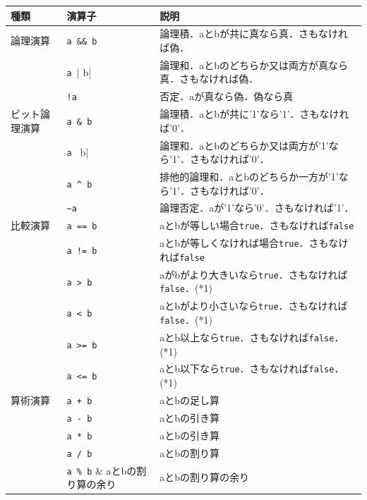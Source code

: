\documentclass[a4paper,dvipdfmx]{jsarticle}
\begin{document}
\begin{table}[H]
\begin{center}
 \begin{tabular}{l|l|l}
 \hline
  種類           & 演算子           & 説明 \\\hline\hline
  論理演算       & \verb|a && b|    & 論理積．aとbが共に真なら真．さもなければ偽．\\\cline{2-3}
                 & \verb|a || b|    & 論理和．aとbのどちらか又は両方が真なら真．さもなければ偽．\\\cline{2-3}
                 & \verb|!a|        & 否定．aが真なら偽．偽なら真\\\hline
  ビット論理演算 & \verb|a & b|     & 論理積．aとbが共に'1'なら'1'．さもなければ'0'．\\\cline{2-3}
                 & \verb|a | b|     & 論理和．aとbのどちらか又は両方が'1'なら'1'．さもなければ'0'．\\\cline{2-3}
                 & \verb|a ^ b|     & 排他的論理和．aとbのどちらか一方が'1'なら'1'．さもなければ'0'．\\\cline{2-3}
                 & \verb|~a|        & 論理否定．aが'1'なら'0'．さもなければ'1'．\\\hline
  比較演算       & \verb|a == b|    & aとbが等しい場合\verb|true|．さもなければ\verb|false|\\\cline{2-3}
                 & \verb|a != b|    & aとbが等しくなければ場合\verb|true|．さもなければ\verb|false|\\\cline{2-3}
                 & \verb|a > b|     & aがbがより大きいなら\verb|true|．さもなければ\verb|false|．(*1)\\\cline{2-3}
                 & \verb|a < b|     & aとbがより小さいなら\verb|true|．さもなければ\verb|false|．(*1)\\\cline{2-3}
                 & \verb|a >= b|    & aとb以上なら\verb|true|．さもなければ\verb|false|．(*1)\\\cline{2-3}
                 & \verb|a <= b|    & aとb以下なら\verb|true|．さもなければ\verb|false|．(*1)\\\hline
  算術演算       & \verb|a + b|     & aとbの足し算\\\cline{2-3}
                 & \verb|a - b|     & aとbの引き算\\\cline{2-3}
                 & \verb|a * b|     & aとbの引き算\\\cline{2-3}
                 & \verb|a / b|     & aとbの割り算\\\cline{2-3}
                 & \verb|a % b|     & aとbの割り算の余り\\\hline

\end{tabular}
\end{center}
\end{table}
\end{document}
